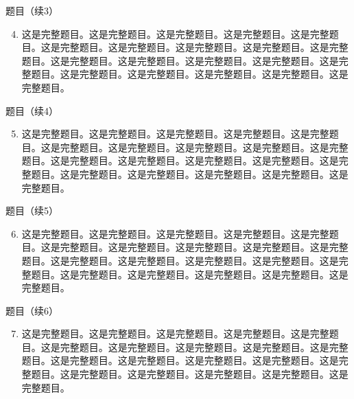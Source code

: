\documentclass[aspectratio=169,10pt,fontset=fandol]{ctexbeamer}
\begin{document}
\begin{frame}[t,fragile]{题目（续3）}
\normalsize
{\normalsize
\begin{enumerate}\setcounter{enumi}{3}
\item 这是完整题目。这是完整题目。这是完整题目。这是完整题目。这是完整题目。这是完整题目。这是完整题目。这是完整题目。这是完整题目。这是完整题目。这是完整题目。这是完整题目。这是完整题目。这是完整题目。这是完整题目。这是完整题目。这是完整题目。这是完整题目。这是完整题目。这是完整题目。

\end{enumerate}
}
\end{frame}
\begin{frame}[t,fragile]{题目（续4）}
\normalsize
{\normalsize
\begin{enumerate}\setcounter{enumi}{4}
\item 这是完整题目。这是完整题目。这是完整题目。这是完整题目。这是完整题目。这是完整题目。这是完整题目。这是完整题目。这是完整题目。这是完整题目。这是完整题目。这是完整题目。这是完整题目。这是完整题目。这是完整题目。这是完整题目。这是完整题目。这是完整题目。这是完整题目。这是完整题目。

\end{enumerate}
}
\end{frame}
\begin{frame}[t,fragile]{题目（续5）}
\normalsize
{\normalsize
\begin{enumerate}\setcounter{enumi}{5}
\item 这是完整题目。这是完整题目。这是完整题目。这是完整题目。这是完整题目。这是完整题目。这是完整题目。这是完整题目。这是完整题目。这是完整题目。这是完整题目。这是完整题目。这是完整题目。这是完整题目。这是完整题目。这是完整题目。这是完整题目。这是完整题目。这是完整题目。这是完整题目。

\end{enumerate}
}
\end{frame}
\begin{frame}[t,fragile]{题目（续6）}
\normalsize
{\normalsize
\begin{enumerate}\setcounter{enumi}{6}
\item 这是完整题目。这是完整题目。这是完整题目。这是完整题目。这是完整题目。这是完整题目。这是完整题目。这是完整题目。这是完整题目。这是完整题目。这是完整题目。这是完整题目。这是完整题目。这是完整题目。这是完整题目。这是完整题目。这是完整题目。这是完整题目。这是完整题目。这是完整题目。

\end{enumerate}
}
\end{frame}
\end{document}
